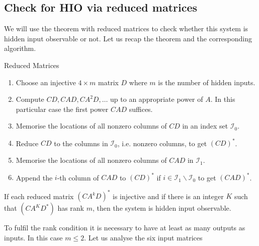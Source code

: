 \clearpage
\subsection*{Check for HIO via reduced matrices}
We will use the theorem with reduced matrices to check whether this system 
is hidden input observable or not. Let us recap the theorem and the corresponding 
algorithm. 
\begin{remark}{Reduced Matrices}{}
	\begin{enumerate}
		\item Choose an injective $4 \times m$ matrix $D$ where $m$ is the number of hidden 
		inputs. 
		\item Compute $CD,CAD,CA^2D,\ldots$ up to an appropriate power of 
		$A$. In this particular case the first power $CAD$ suffices. 
		\item Memorise the locations of all nonzero columns of $CD$ in an index set 
		$\mathcal{I}_0$. 
		\item Reduce $CD$ to the columns in $\mathcal{I}_0$, i.e. nonzero columns, to get 
		$(CD)^*$.
		\item Memorise the locations of all nonzero columns of $CAD$ in $\mathcal{I}_1$.
		\item Append the $i$-th column of $CAD$ to $(CD)^*$ if $i\in\mathcal{I}_1\backslash 
		\mathcal{I}_0$ to get $(CAD)^*$.
	\end{enumerate}
	If each reduced matrix $(CA^kD)^*$ is injective and if there is an integer $K$ such 
	that $(CA^KD^*)$ has rank $m$, then the system is hidden input observable.
\end{remark}
To fulfil the rank condition it is necessary to have at least as many outputs as inputs. In 
this case $m\leq 2$. Let us analyse the six input matrices 
